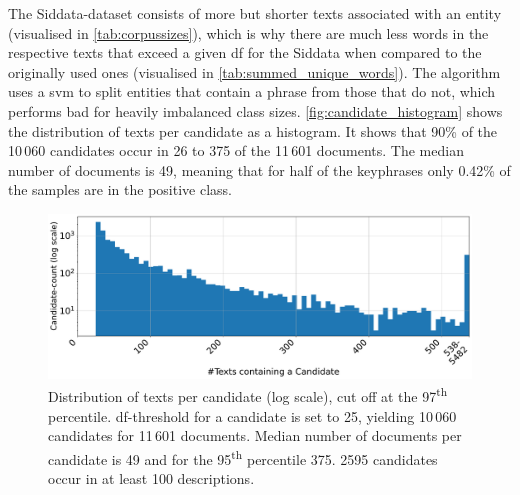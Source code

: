 

The Siddata-dataset consists of more but shorter texts associated with an entity (visualised in \autoref{tab:corpussizes}), which is why there are much less words in the respective texts that exceed a given \gls{df} for the Siddata when compared to the originally used ones (visualised in \autoref{tab:summed_unique_words}). The algorithm uses a \gls{svm} to split entities that contain a phrase from those that do not, which performs bad for heavily imbalanced class sizes. \autoref{fig:candidate_histogram} shows the distribution of texts per candidate as a histogram. It shows that 90\% of the 10\,060 candidates occur in 26 to 375 of the 11\,601 documents. The median number of documents is 49, meaning that for half of the keyphrases only 0.42\% of the samples are in the positive class.

\begin{figure}[H]
	\centering
	\includegraphics[width=\figwidth]{graphics/dataset_new/docs_per_phrase.pdf}
	\caption[Distribution of texts per candidate.]{Distribution of texts per candidate (log scale), cut off at the 97\textsuperscript{th} percentile. \Gls{df}-threshold for a candidate is set to 25, yielding 10\,060 candidates for 11\,601 documents. Median number of documents per candidate is 49 and for the 95\textsuperscript{th} percentile 375. 2595 candidates occur in at least 100 descriptions.}
	\label{fig:candidate_histogram}
\end{figure}

